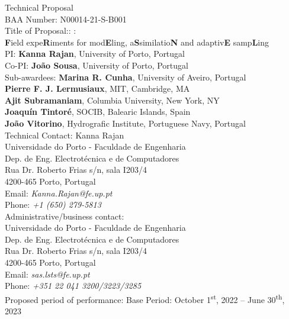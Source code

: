\begin{titlepage}

\begin{center}
\Large
Technical Proposal\\
BAA Number: N00014-21-S-B001\\
Title of Proposal:: \proje:\\\textbf{F}ield expe\textbf{R}iments for mod\textbf{E}ling, a\textbf{S}similatio\textbf{N} and adaptiv\textbf{E} samp\textbf{L}ing\\


\vspace{+1in}
\large
PI: \textbf{Kanna Rajan}, University of Porto, Portugal\\
Co-PI: \textbf{Jo\~ao Sousa}, University of Porto, Portugal\\
Sub-awardees: 
\textbf{Marina R. Cunha}, University of Aveiro, Portugal\\
\textbf{Pierre F. J. Lermusiaux}, MIT, Cambridge, MA\\
\textbf{Ajit Subramaniam}, Columbia University, New York, NY\\
\textbf{Joaqu\'{i}n Tintor\'{e}}, SOCIB, Balearic Islands, Spain\\
\textbf{Jo\~ao Vitorino}, Hydrografic Institute, Portuguese Navy, Portugal\\
\vspace{+1in}
Technical Contact: Kanna Rajan\\
Universidade do Porto - Faculdade de Engenharia\\
Dep. de Eng. Electrot\'{e}cnica e de Computadores\\
Rua Dr. Roberto Frias s/n, sala I203/4\\
4200-465 Porto, Portugal\\
Email: \emph{Kanna.Rajan@fe.up.pt}\\
Phone: \emph{+1 (650) 279-5813}\\
\vspace{0.5in}
Administrative/business contact: \\
Universidade do Porto - Faculdade de Engenharia\\
Dep. de Eng. Electrot\'{e}cnica e de Computadores\\
Rua Dr. Roberto Frias s/n, sala I203/4\\
4200-465 Porto, Portugal\\
Email: \emph{sas.lsts@fe.up.pt}\\
Phone: \emph{+351 22 041 3200/3223/3285}\\
\vspace{0.5in}
Proposed period of performance: Base Period: October
1\textsuperscript{st}, 2022 -- June 30\textsuperscript{th}, 2023


\end{center}
\end{titlepage}

